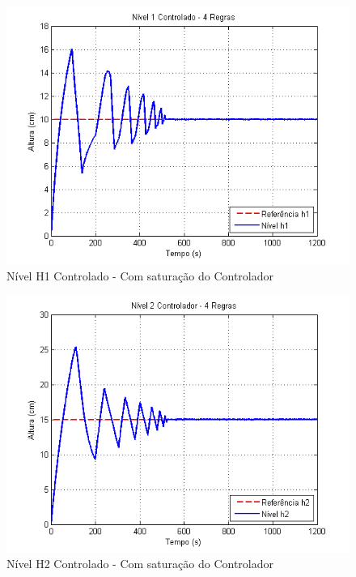\begin{figure}[H]
	\centering
	\includegraphics[height=0.35\paperheight ,keepaspectratio]{img/ctrl_h1ts2_ulim.png}
	\caption{\small Nível H1 Controlado - Com saturação do Controlador }
	\label{figH1TSCtrl2_ulim}
\end{figure}

\begin{figure}[H]
	\centering
	\includegraphics[height=0.35\paperheight ,keepaspectratio]{img/ctrl_h2ts2_ulim.png}
	\caption{Nível H2 Controlado - Com saturação do Controlador }
	\label{figH2CtrlTS2_ulim}
\end{figure}

